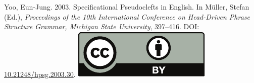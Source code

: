 \documentclass[11pt,a4paper,fleqn]{article}
\begin{document}
\noindent



\vfill
\noindent
Yoo, Eun-Jung. 2003. Specificational Pseudoclefts in English. In Müller, Stefan (Ed.), \emph{{Proceedings of the 10th International Conference on Head-Driven Phrase Structure Grammar, Michigan State University}},
397--416. DOI: \href{http://doi.org/10.21248/hpsg.2003.30}{10.21248/hpsg.2003.30}. \hfill\href{http://creativecommons.org/licenses/by/4.0/}{\includegraphics[height=.75em]{Includes/ccby-eps-converted-to.pdf}}

\newpage

\end{document}
